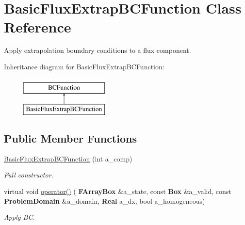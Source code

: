 \hypertarget{class_basic_flux_extrap_b_c_function}{}\section{Basic\+Flux\+Extrap\+B\+C\+Function Class Reference}
\label{class_basic_flux_extrap_b_c_function}


Apply extrapolation boundary conditions to a flux component.  


Inheritance diagram for Basic\+Flux\+Extrap\+B\+C\+Function\+:\begin{figure}[H]
\begin{center}
\leavevmode
\includegraphics[height=2.000000cm]{class_basic_flux_extrap_b_c_function}
\end{center}
\end{figure}
\subsection*{Public Member Functions}
\begin{DoxyCompactItemize}
\item 
\mbox{\label{class_basic_flux_extrap_b_c_function_a0f3d312b4ee41771e6e48b8bd4f17469}} 
\hyperlink{class_basic_flux_extrap_b_c_function_a0f3d312b4ee41771e6e48b8bd4f17469}{Basic\+Flux\+Extrap\+B\+C\+Function} (int a\+\_\+comp)
\begin{DoxyCompactList}\small\item\em Full constructor. \end{DoxyCompactList}\item 
\mbox{\label{class_basic_flux_extrap_b_c_function_abe5db40b5f849d39e06b44376d0b6bdf}} 
virtual void \hyperlink{class_basic_flux_extrap_b_c_function_abe5db40b5f849d39e06b44376d0b6bdf}{operator()} (\textbf{ F\+Array\+Box} \&a\+\_\+state, const \textbf{ Box} \&a\+\_\+valid, const \textbf{ Problem\+Domain} \&a\+\_\+domain, \textbf{ Real} a\+\_\+dx, bool a\+\_\+homogeneous)
\begin{DoxyCompactList}\small\item\em Apply BC. \end{DoxyCompactList}\end{DoxyCompactItemize}
